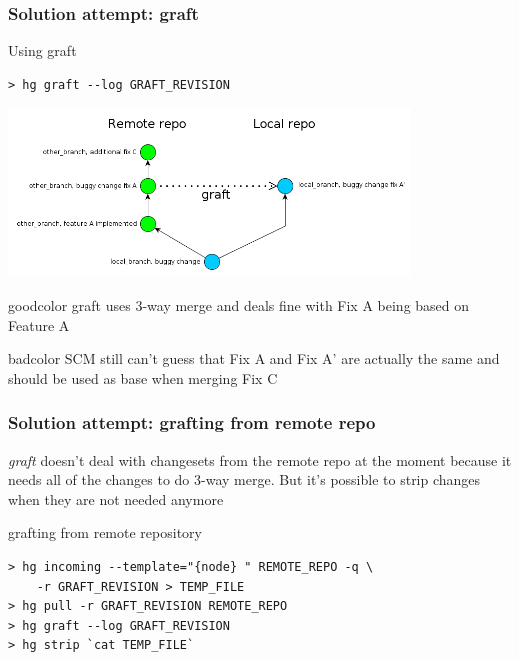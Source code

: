 \documentclass{beamer}
\begin{document}
\begin{frame}[fragile]
\frametitle{Solution attempt: graft}
\begin{exampleblock}{Using graft}
\begin{verbatim}
> hg graft --log GRAFT_REVISION
\end{verbatim}
\end{exampleblock}
\begin{center}
\includegraphics[width=0.8\textwidth]{img/using_graft}
\end{center}

\begin{beamercolorbox}[rounded=true,center,shadow=true]{goodcolor}
  graft uses 3-way merge and deals fine with Fix A being based on Feature A
\end{beamercolorbox}
\begin{beamercolorbox}[rounded=true,center,shadow=true]{badcolor}
  SCM still can't guess that Fix A and Fix A' are actually the same and should be used as base when merging Fix C
\end{beamercolorbox}
\end{frame}

\begin{frame}[fragile]
\frametitle{Solution attempt: grafting from remote repo}
\textit{graft} doesn't deal with changesets from the remote repo at the moment because it needs all of the changes to do 3-way merge. But it's possible to strip changes when they are not needed anymore
\begin{exampleblock}{grafting from remote repository}
\begin{verbatim}
> hg incoming --template="{node} " REMOTE_REPO -q \ 
    -r GRAFT_REVISION > TEMP_FILE
> hg pull -r GRAFT_REVISION REMOTE_REPO
> hg graft --log GRAFT_REVISION
> hg strip `cat TEMP_FILE`
\end{verbatim}
\end{exampleblock}
\end{frame}
\end{document}
